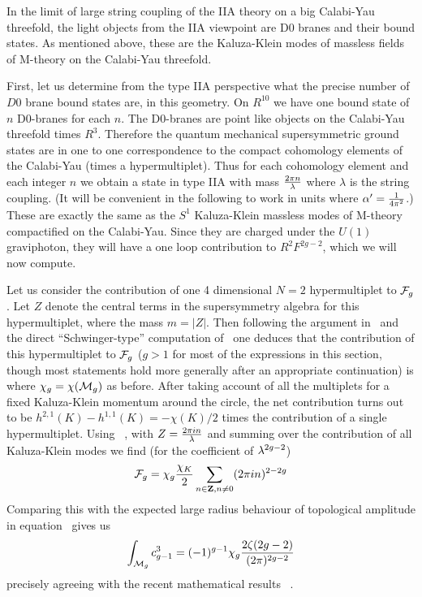 In the limit of large string coupling of the IIA theory on a big Calabi-Yau
threefold, the light objects from the IIA viewpoint
are D0 branes and their bound states. As mentioned above, these are
the Kaluza-Klein modes of massless fields of M-theory on the Calabi-Yau
threefold.

First, let us determine from the type IIA perspective
what the precise number of $D0$ brane bound states are, in this geometry.
On $R^{10}$ we have one bound state of $n$ D0-branes for each $n$.
The D0-branes are point like objects on the Calabi-Yau
threefold times $R^3$. Therefore the quantum mechanical
supersymmetric ground states
are in one to one correspondence to the compact cohomology elements of the
Calabi-Yau (times a hypermultiplet). Thus for each cohomology element and each
integer $n$ we obtain a state in type IIA with mass ${2\pi n\over \lambda}$
where $\lambda$ is the string coupling. (It will be convenient in the
following
to work in
units where $\alpha^{\prime}={1\over 4\pi^2}$.) These are exactly the same
as the $S^1$ Kaluza-Klein massless modes of M-theory
compactified on the Calabi-Yau.  Since they are charged under
the $U(1)$ graviphoton, they will have a one loop contribution to
$R^2 F^{2g-2}$, which we will now compute.

Let us consider the contribution of one 4 dimensional $N=2$
hypermultiplet to
${\cal F}_g$.  Let $Z$ denote the central terms in the supersymmetry
algebra for this hypermultiplet, where the mass $m=|Z|$.  Then following
the argument in \ghovaf\ and the direct ``Schwinger-type'' computation
of \narcon\ one deduces that the contribution
of this hypermultiplet to ${\cal F}_g$ ($g>1$ for most of
the expressions in this section, though most statements
hold more generally after an appropriate continuation) is
%
\eqn{}
%
where $\chi_g=\chi({\cal M}_g)$ as before.
%
%
After taking account of all the multiplets
for a fixed Kaluza-Klein momentum around the circle, the net contribution
turns out to be $h^{2,1}(K)-h^{1,1}(K)={-\chi (K)/2}$ times the contribution of
a single hypermultiplet.  Using \conh\ , with $Z={2\pi
in\over \lambda}$ and summing over the contribution
of all Kaluza-Klein modes we find (for the coefficient of $\lambda^{2g-2}$)
%
$${\cal F}_g=\chi_g {\chi_K \over 2}\sum_{n\in {\bf Z}, n\neq 0} (2\pi
in)^{2-2g}$$
%
Comparing this with the expected large radius behaviour of topological
amplitude in equation \raje\ gives us
%
$$\int_{{\cal M}_g}c_{g-1}^3 = (-1)^{g-1}\chi_g{2\zeta(2g-2)\over
(2\pi)^{2g-2}}$$
%
precisely agreeing with the recent mathematical results \cgeqn\ .

